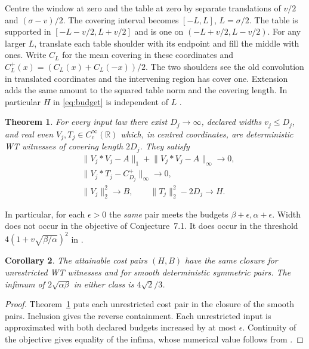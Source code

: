 \documentclass[11pt]{article}
\newtheorem{theorem}{Theorem}
\newtheorem{corollary}[theorem]{Corollary}
\newcommand{\R}{\mathbb R}
\newcommand{\norm}[1]{\lVert #1\rVert}
\newcommand{\cc}{C_c^\infty(\R)}
\begin{document}
Centre the window at zero and the table at zero by separate translations of \(v/2\) and \((\sigma-v)/2\). The covering interval becomes \([-L,L]\), \(L=\sigma/2\). The table is supported in \([-L-v/2,L+v/2]\) and is one on \((-L+v/2,L-v/2)\). For any larger \(L\), translate each table shoulder with its endpoint and fill the middle with ones. Write \(C_L\) for the mean covering in these coordinates and \(C_L^+(x)=(C_L(x)+C_L(-x))/2\). The two shoulders see the old convolution in translated coordinates and the intervening region has cover one. Extension adds the same amount to the squared table norm and the covering length. In particular \(H\) in \eqref{eq:budget} is independent of \(L\) \cite[Lemma 2.7]{cot}.

\begin{theorem}\label{th:main}
For every input law there exist \(D_j\to\infty\), declared widths \(v_j\le D_j\), and real even \(V_j,T_j\in\cc\) which, in centred coordinates, are deterministic WT witnesses of covering length \(2D_j\). They satisfy
\begin{align*}
 &\norm{V_j*V_j-A}_1+\norm{V_j*V_j-A}_\infty\longrightarrow0,\\
 &\norm{V_j*T_j-C_{D_j}^+}_\infty\longrightarrow0,\\
 &\norm{V_j}_2^2\longrightarrow B,\qquad
 \norm{T_j}_2^2-2D_j\longrightarrow H .
\end{align*}
\end{theorem}
In particular, for each \(\epsilon>0\) the \emph{same} pair meets the budgets \(\beta+\epsilon,\alpha+\epsilon\). Width does not occur in the objective of Conjecture~7.1. It does occur in the threshold \(4(1+v\sqrt{\beta/\alpha})^2\) in \cite[Theorem 2.3]{cot}.

\begin{corollary}\label{cor:intersection}
The attainable cost pairs \((H,B)\) have the same closure for unrestricted WT witnesses and for smooth deterministic symmetric pairs. The infimum of \(2\sqrt{\alpha\beta}\) in either class is \(4\sqrt2/3\).
\end{corollary}
\begin{proof}
Theorem~\ref{th:main} puts each unrestricted cost pair in the closure of the smooth pairs. Inclusion gives the reverse containment. Each unrestricted input is approximated with both declared budgets increased by at most \(\epsilon\). Continuity of the objective gives equality of the infima, whose numerical value follows from \cite{aw}.
\end{proof}
\end{document}
